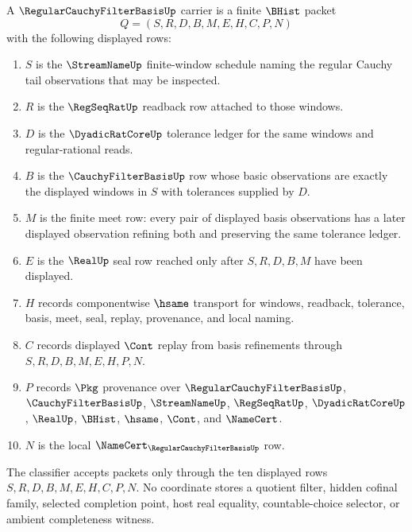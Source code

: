 \begin{definition}
\label{def:regular-cauchy-filter-basis-carrier}
A $\RegularCauchyFilterBasisUp$ carrier is a finite $\BHist$ packet
$$
Q=(S,R,D,B,M,E,H,C,P,N)
$$
with the following displayed rows:
\begin{enumerate}
\item $S$ is the $\StreamNameUp$ finite-window schedule naming the regular Cauchy tail observations that may be inspected.
\item $R$ is the $\RegSeqRatUp$ readback row attached to those windows.
\item $D$ is the $\DyadicRatCoreUp$ tolerance ledger for the same windows and regular-rational reads.
\item $B$ is the $\CauchyFilterBasisUp$ row whose basic observations are exactly the displayed windows in $S$ with tolerances supplied by $D$.
\item $M$ is the finite meet row: every pair of displayed basis observations has a later displayed observation refining both and preserving the same tolerance ledger.
\item $E$ is the $\RealUp$ seal row reached only after $S,R,D,B,M$ have been displayed.
\item $H$ records componentwise $\hsame$ transport for windows, readback, tolerance, basis, meet, seal, replay, provenance, and local naming.
\item $C$ records displayed $\Cont$ replay from basis refinements through $S,R,D,B,M,E,H,P,N$.
\item $P$ records $\Pkg$ provenance over $\RegularCauchyFilterBasisUp$, $\CauchyFilterBasisUp$, $\StreamNameUp$, $\RegSeqRatUp$, $\DyadicRatCoreUp$, $\RealUp$, $\BHist$, $\hsame$, $\Cont$, and $\NameCert$.
\item $N$ is the local $\NameCert_{\RegularCauchyFilterBasisUp}$ row.
\end{enumerate}
The classifier accepts packets only through the ten displayed rows $S,R,D,B,M,E,H,C,P,N$. No coordinate stores a quotient filter, hidden cofinal family, selected completion point, host real equality, countable-choice selector, or ambient completeness witness.
\end{definition}

